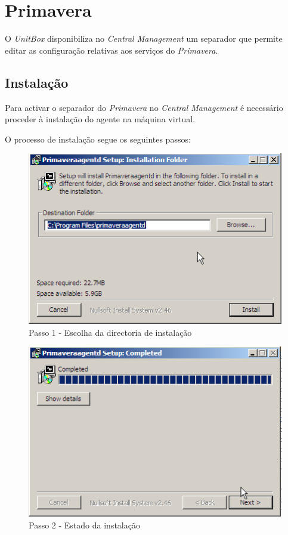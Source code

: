 \section{Primavera}

O \textit{UnitBox} disponibiliza no \textit{Central Management} um separador que permite editar as configuração relativas aos serviços do \textit{Primavera}.

\subsection{Instalação}

Para activar o separador do \textit{Primavera} no \textit{Central Management} é necessário proceder à instalação do agente na máquina virtual.

O processo de instalação segue os seguintes passos:

\begin{figure}[H]
    \begin{center}
    \includegraphics[scale=0.38]{screenshots/primavera/primaverainstall_01.png}
    \caption{Passo 1 - Escolha da directoria de instalação}
    \label{fig:primavera_install_passo1}
    \end{center}
\end{figure}

\begin{figure}[H]
    \begin{center}
    \includegraphics[scale=0.38]{screenshots/primavera/primaverainstall_02.png}
    \caption{Passo 2 - Estado da instalação}
    \label{fig:primavera_install_passo2}
    \end{center}
\end{figure}

